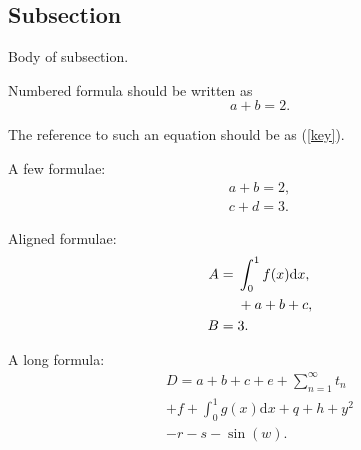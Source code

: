 \documentclass{procDDs}
\begin{document}
\begin{table}[h!]
	\label{table:desc6}
\end{table}
 
\subsection{Subsection}

Body of subsection.

Numbered formula should be written as
\begin{equation}\label{key}                       %
a+b=2.                                         %
\end{equation}

The reference to such an equation should be as (\ref{key}).

A few formulae:
\begin{gather}                       %
a+b=2,\label{key1}\\
c+d=3.\label{key2}
\end{gather}


Aligned formulae:
\begin{align}                       %
A={}&\int_0^1f(x)\mathrm{d}x,\notag\\
&{}+a+b+c,\label{key3}\\
B={}&3.\label{key4}
\end{align}

A long formula:
\begin{multline}
D=a+b+c+e+\sum_{n=1}^\infty t_n\\
+f+\int_0^1g(x)\mathrm{d}x+q+h+y^2\\
-r-s-\sin(w).
\end{multline}
 
\end{document}
